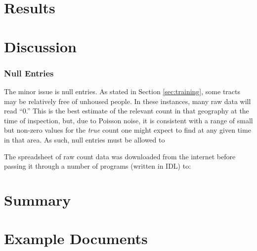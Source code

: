\documentclass[11pt,twocolumn]{article}
\begin{document}
\section{Results}
\label{sec:results}

\section{Discussion}
\label{sec:discussion}


\subsubsection{Null Entries}

The minor issue is null entries. As stated in Section \ref{sec:training}, some tracts may be 
relatively free of unhoused people. In these instances, many raw data will read ``0.'' This is
the best estimate of the relevant count in that geography at the time of inspection, but, due to 
Poisson noise, it is consistent with a range of small but non-zero values for the {\it true} count 
one might expect to find at any given time in that area. As such, null entries must be allowed 
to 

The spreadsheet of raw count data was downloaded from the internet before passing it through a number
of programs (written in IDL) to:


\section{Summary}
\label{sec:summary}

\appendix

\section{Example Documents}
\end{document}
